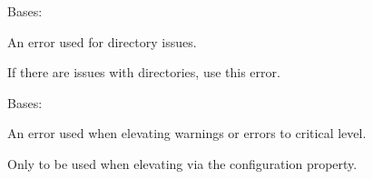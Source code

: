 \documentclass[letterpaper,11pt,english]{sphinxmanual}
\begin{document}
\begin{savenotes}\begin{fulllineitems}
\label{\detokenize{code/lezargus.library.logging:lezargus.library.logging.DirectoryError}}
\pysigstartsignatures
{}
\pysigstopsignatures
\sphinxAtStartPar
Bases: {\hyperref[\detokenize{code/lezargus.library.logging:lezargus.library.logging.LezargusError}]{}}

\sphinxAtStartPar
An error used for directory issues.

\sphinxAtStartPar
If there are issues with directories, use this error.

\end{fulllineitems}\end{savenotes}


\begin{savenotes}\begin{fulllineitems}
\label{\detokenize{code/lezargus.library.logging:lezargus.library.logging.ElevatedError}}
\pysigstartsignatures
{}
\pysigstopsignatures
\sphinxAtStartPar
Bases: {\hyperref[\detokenize{code/lezargus.library.logging:lezargus.library.logging.LezargusError}]{}}

\sphinxAtStartPar
An error used when elevating warnings or errors to critical level.

\sphinxAtStartPar
Only to be used when elevating via the configuration property.

\end{fulllineitems}\end{savenotes}

\end{document}
